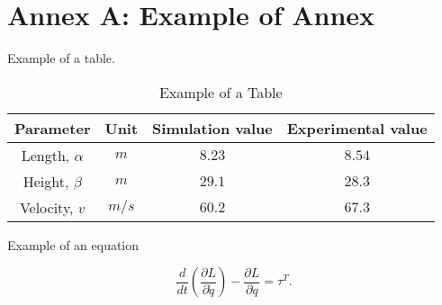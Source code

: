 \section{Annex A: Example of Annex}
\label{anexoA}


Example of a table.

\begin{table}[ht]
\caption{Example of a Table}
\label{minhatab}

\center
\begin{tabular}{cccc}
  \hline
	Parameter & Unit & Simulation value & Experimental value   \\
	\hline
  Length, $\alpha$ & $m$ &  $8.23$  & $8.54$ \\
  Height, $\beta$ & $m$     &  $29.1$ & $28.3$\\
	Velocity, $v$ & $m/s$  &  $60.2$ & $67.3$\\
	\hline
\end{tabular}
\end{table}




Example of an equation

\begin{equation} \label{eq:lagr1}
\frac{d}{dt}(\frac{\partial L}{\partial \dot{q}})-\frac{\partial L}{\partial q}=\tau^{T}.
\end{equation}

